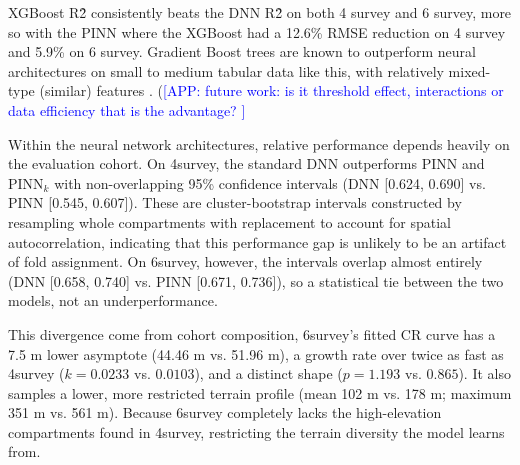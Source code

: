 \documentclass[logo,msc,ai]{infthesis}           %
\newcommand{\app}[1]{\textcolor{blue}{[APP: #1]}}
\begin{document}
XGBoost R\^2 consistently beats the DNN R\^2 on both 4 survey and 6 survey, more so with the PINN where the XGBoost had a 12.6\% RMSE reduction on 4 survey and 5.9\% on 6 survey. Gradient Boost trees are known to outperform neural architectures on small to medium tabular data like this, with relatively mixed-type (similar) features \cite{shwartzziv2021Tabular_C4_NN}. (\app{future work: is it threshold effect, interactions or data efficiency that is the advantage? }



Within the neural network architectures, relative performance depends heavily on the evaluation cohort. On 4survey, the standard DNN outperforms PINN and $\text{PINN}_k$ with non-overlapping 95\% confidence intervals (DNN [0.624, 0.690] vs. PINN [0.545, 0.607]). These are cluster-bootstrap intervals constructed by resampling whole compartments with replacement to account for spatial autocorrelation, indicating that this performance gap is unlikely to be an artifact of fold assignment. On 6survey, however, the intervals overlap almost entirely (DNN [0.658, 0.740] vs. PINN [0.671, 0.736]), so a statistical tie between the two models, not an underperformance.

This divergence come from cohort composition, 6survey’s fitted CR curve has a 7.5 m lower asymptote (44.46 m vs. 51.96 m), a growth rate over twice as fast as 4survey ($k = 0.0233$ vs. $0.0103$), and a distinct shape ($p = 1.193$ vs. $0.865$). It also samples a lower, more restricted terrain profile (mean 102 m vs. 178 m; maximum 351 m vs. 561 m). Because 6survey completely lacks the high-elevation compartments found in 4survey, restricting the terrain diversity the model learns from. 
\end{document}
